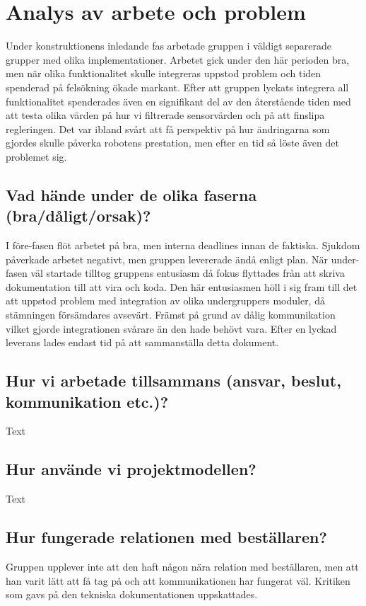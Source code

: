 \documentclass{article}
\begin{document}
\section{Analys av arbete och problem}
Under konstruktionens inledande fas arbetade gruppen i väldigt separerade grupper med olika implementationer. Arbetet gick under den här perioden bra, men när olika funktionalitet skulle integreras uppstod problem och tiden spenderad på felsökning ökade markant. Efter att gruppen lyckats integrera all funktionalitet spenderades även en signifikant del av den återstående tiden med att testa olika värden på hur vi filtrerade sensorvärden och på att finslipa regleringen. Det var ibland svårt att få perspektiv på hur ändringarna som gjordes skulle påverka robotens prestation, men efter en tid så löste även det problemet sig.

\subsection{Vad hände under de olika faserna (bra/dåligt/orsak)?}
I före-fasen flöt arbetet på bra, men interna deadlines innan de faktiska. Sjukdom påverkade arbetet negativt, men gruppen levererade ändå enligt plan. När under-fasen väl startade tilltog gruppens entusiasm då fokus flyttades från att skriva dokumentation till att vira och koda. Den här entusiasmen höll i sig fram till det att uppstod problem med integration av olika undergruppers moduler, då stämningen försämdares avsevärt. Främst på grund av dålig kommunikation vilket gjorde integrationen svårare än den hade behövt vara. Efter en lyckad leverans lades endast tid på att sammanställa detta dokument.

\subsection{Hur vi arbetade tillsammans (ansvar, beslut, kommunikation etc.)?}
Text

\subsection{Hur använde vi projektmodellen?}
Text

\subsection{Hur fungerade relationen med beställaren?}
Gruppen upplever inte att den haft någon nära relation med beställaren, men att han varit lätt att få tag på och att kommunikationen har fungerat väl. Kritiken som gavs på den tekniska dokumentationen uppskattades. 
\end{document}
